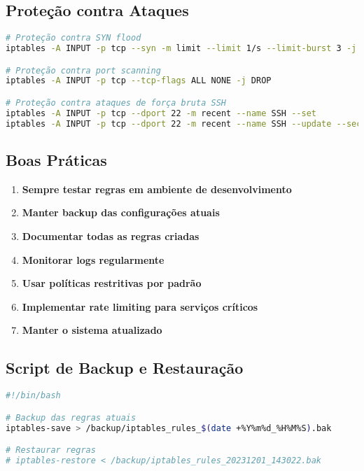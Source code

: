 \documentclass[12pt,fleqn]{article}
\begin{document}
\subsection{Proteção contra Ataques}

\begin{lstlisting}[language=bash, caption=Proteções de segurança]
# Proteção contra SYN flood
iptables -A INPUT -p tcp --syn -m limit --limit 1/s --limit-burst 3 -j ACCEPT

# Proteção contra port scanning
iptables -A INPUT -p tcp --tcp-flags ALL NONE -j DROP

# Proteção contra ataques de força bruta SSH
iptables -A INPUT -p tcp --dport 22 -m recent --name SSH --set
iptables -A INPUT -p tcp --dport 22 -m recent --name SSH --update --seconds 60 --hitcount 4 -j DROP
\end{lstlisting}

\subsection{Boas Práticas}

\begin{enumerate}
    \item \textbf{Sempre testar regras em ambiente de desenvolvimento}
    \item \textbf{Manter backup das configurações atuais}
    \item \textbf{Documentar todas as regras criadas}
    \item \textbf{Monitorar logs regularmente}
    \item \textbf{Usar políticas restritivas por padrão}
    \item \textbf{Implementar rate limiting para serviços críticos}
    \item \textbf{Manter o sistema atualizado}
\end{enumerate}

\subsection{Script de Backup e Restauração}

\begin{lstlisting}[language=bash, caption=Script de backup]
#!/bin/bash

# Backup das regras atuais
iptables-save > /backup/iptables_rules_$(date +%Y%m%d_%H%M%S).bak

# Restaurar regras
# iptables-restore < /backup/iptables_rules_20231201_143022.bak
\end{lstlisting}
\end{document}

